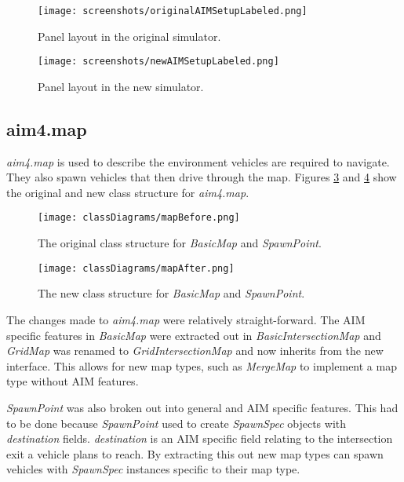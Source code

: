 \begin{appendices}
\begin{figure}[p]
\centerline{
\texttt{[image: screenshots/originalAIMSetupLabeled.png]}
}
\caption{Panel layout in the original simulator.}
\label{fig:originalAIMSetupLabeled}
\end{figure}

\begin{figure}[p]
\centerline{
\texttt{[image: screenshots/newAIMSetupLabeled.png]}
}
\caption{Panel layout in the new simulator.}
\label{fig:newAIMSetupLabeled}
\end{figure}

\FloatBarrier
\subsection{aim4.map}
\label{subsec:aim4.map}
\emph{aim4.map} is used to describe the environment vehicles are required to navigate. They also spawn vehicles that then drive through the map. Figures \ref{fig:mapBefore} and \ref{fig:mapAfter} show the original and new class structure for \emph{aim4.map}.

\begin{figure}[htb]
\centering
\texttt{[image: classDiagrams/mapBefore.png]}
\caption{The original class structure for \emph{BasicMap} and \emph{SpawnPoint}.}
\label{fig:mapBefore}
\end{figure}

\begin{figure}[htb]
\centering
\texttt{[image: classDiagrams/mapAfter.png]}
\caption{The new class structure for \emph{BasicMap} and \emph{SpawnPoint}.}
\label{fig:mapAfter}
\end{figure}

The changes made to \emph{aim4.map} were relatively straight-forward. The AIM specific features in \emph{BasicMap} were extracted out in \emph{BasicIntersectionMap} and \emph{GridMap} was renamed to \emph{GridIntersectionMap} and now inherits from the new interface. This allows for new map types, such as \emph{MergeMap} to implement a map type without AIM features.

\emph{SpawnPoint} was also broken out into general and AIM specific features. This had to be done because \emph{SpawnPoint} used to create \emph{SpawnSpec} objects with \emph{destination} fields. \emph{destination} is an AIM specific field relating to the intersection exit a vehicle plans to reach. By extracting this out new map types can spawn vehicles with \emph{SpawnSpec} instances specific to their map type.


\end{appendices}
